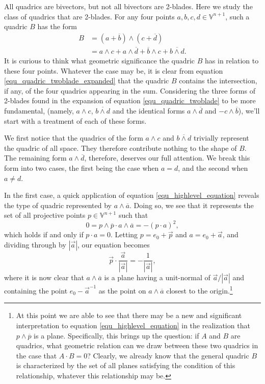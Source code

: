 \documentclass{ecgd-l}
\theoremstyle{definition}
\theoremstyle{remark}
\numberwithin{equation}{section}
\newcommand{\V}{\mathbb{V}}
\begin{document}
All quadrics are bivectors, but not all bivectors are 2-blades.  Here
we study the class of quadrics that are 2-blades.  For any four
points $a,b,c,d\in\V^{n+1}$, such a quadric $B$ has the form
\begin{align}
B &= (a+\overline{b})\wedge(c+\overline{d})\label{equ_quadric_twoblade} \\
 &= a\wedge c + a\wedge\overline{d} + \overline{b}\wedge c + \overline{b\wedge d}.\label{equ_quadric_twoblade_expanded}
\end{align}
It is curious to think what geometric significance the quadric $B$ has in relation
to these four points.  Whatever the case may be, it is clear from equation
\eqref{equ_quadric_twoblade_expanded} that the quadric $B$ contains the intersection, if any,
of the four quadrics appearing in the sum.  Considering the three forms of 2-blades
found in the expansion of equation \eqref{equ_quadric_twoblade} to be more
fundamental, (namely, $a\wedge c$, $\overline{b\wedge d}$ and
the identical forms $a\wedge\overline{d}$ and $-c\wedge\overline{b}$), we'll
start with a treatment of each of these forms.

We first notice that the quadrics of the form $a\wedge c$ and $\overline{b\wedge d}$
trivially represent the quadric of all space.  They therefore contribute nothing
to the shape of $B$.  The remaining form $a\wedge\overline{d}$, therefore,
deserves our full attention.  We break this form into two cases, the first being
the case when $a=d$, and the second when $a\neq d$.

In the first case, a quick application of equation
\eqref{equ_highlevel_equation} reveals the type of quadric
represented by $a\wedge\overline{a}$.  Doing so, we see that it represents
the set of all projective points $p\in\V^{n+1}$ such that
\begin{equation}
0=p\wedge\overline{p}\cdot a\wedge\overline{a}=-(p\cdot a)^2,
\end{equation}
which holds if and only if $p\cdot a=0$.
Letting $p=e_0+\vec{p}$ and $a=e_0+\vec{a}$, and dividing through
by $|\vec{a}|$, our equation becomes
\begin{equation}
\vec{p}\cdot\frac{\vec{a}}{|\vec{a}|} = -\frac{1}{|\vec{a}|},
\end{equation}
where it is now clear that $a\wedge\overline{a}$ is a plane having
a unit-normal of $\vec{a}/|\vec{a}|$ and containing the point $e_0-\vec{a}^{-1}$
as the point on $a\wedge\overline{a}$ closest to the origin.\footnote{At this point we are able to see that there may be a new
and significant interpretation to equation \eqref{equ_highlevel_equation}
in the realization that $p\wedge\overline{p}$ is a plane.  Specifically,
this brings up the question: if $A$ and $B$ are quadrics, what geometric
relation can we draw between these two quadrics in the case that
$A\cdot B=0$?  Clearly, we already know that the general
quadric $B$ is characterized by the set of all planes satisfying
the condition of this relationship, whatever this relationship may be.}
\end{document}
